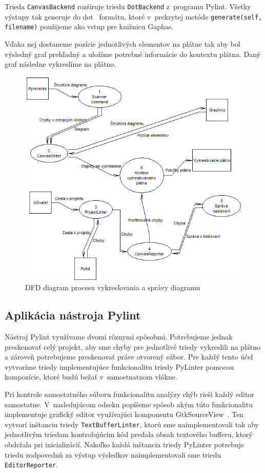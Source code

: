 \documentclass[11pt,oneside,final]{fithesis2}
\begin{document}
			Trieda \texttt{CanvasBackend} rozširuje triedu \texttt{DotBackend} z~programu Pylint. Všetky výstupy tak generuje do dot~\cite{dot} formátu, ktoré v~prekrytej metóde \texttt{generate(self, filename)} použijeme ako vstup pre knižnicu Gaphas. 
			
			Vďaka nej dostaneme pozície jednotlivých elementov na plátne tak aby bol výsledný graf prehľadný a uložíme potrebné informácie do kontextu plátna. Daný graf následne vykreslíme na plátno.
	

	\begin{figure}[htb]
	 \centering
	 \includegraphics[width=\textwidth]{images/dfd_diagram}
	 \caption{DFD diagram procesu vykresľovania a správy diagramu}
	\end{figure}

	
		\subsection{Aplikácia nástroja Pylint}

		Nástroj Pylint využívame dvomi rôznymi spôsobmi. Potrebujeme jednak preskenovať celý projekt, aby sme chyby pre jednotlivé triedy vykreslili na plátno a zároveň potrebujeme preskenovať práve otvorený súbor. Pre každý tento účel vytvoríme triedy implementujúce funkcionalitu triedy PyLinter pomocou kompozície, ktoré budú bežať v~samostnatnom vlákne. 
		
		Pri kontrole samostatného súboru funkcionalitu analýzy chýb rieši každý editor samostatne. V~nasledujúcom odseku popíšeme spôsob akým túto funkcionalitu implementuje grafický editor využívajúci komponentu GtkSourceView~\cite{gtksourceview}. Ten vytvorí inštanciu triedy \texttt{TextBufferLinter}, ktorú sme naimplementovali tak aby jednotlivým triedam kontrolujúcim kód predala obsah textového bufferu, ktorý obdržala pri inicializácií. Nakoľko každá inštancia triedy PyLinter potrebuje triedu zodpovednú za výstup výsledkov naimplementovali sme triedu \texttt{EditorReporter}.
		
\end{document}
